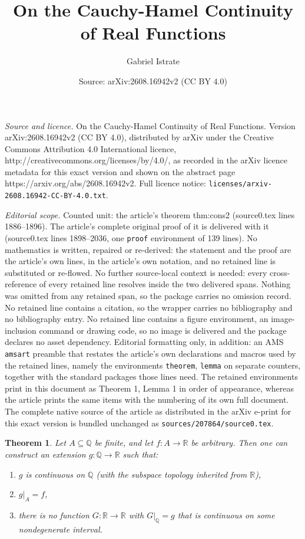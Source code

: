\documentclass[10pt,a4paper]{amsart}
\title{On the Cauchy-Hamel Continuity of Real Functions}
\author{Gabriel Istrate}
\date{Source: arXiv:2608.16942v2 (CC BY 4.0)}
\newtheorem{theorem}{Theorem}
\begin{document}
\maketitle

\noindent\emph{Source and licence.} On the Cauchy-Hamel Continuity of Real Functions. Version arXiv:2608.16942v2 (CC BY 4.0), distributed by arXiv under the Creative Commons Attribution 4.0 International licence, http://creativecommons.org/licenses/by/4.0/, as recorded in the arXiv licence metadata for this exact version and shown on the abstract page https://arxiv.org/abs/2608.16942v2. Full licence notice: \texttt{licenses/arxiv-2608.16942-CC-BY-4.0.txt}.\par\smallskip

\noindent\textit{Editorial scope.} Counted unit: the article's theorem thm:cons2 (source0.tex lines 1886--1896). The article's complete original proof of it is delivered with it (source0.tex lines 1898--2036, one \texttt{proof} environment of 139 lines). No mathematics is written, repaired or re-derived: the statement and the proof are the article's own lines, in the article's own notation, and no retained line is substituted or re-flowed.  No further source-local context is needed: every cross-reference of every retained line resolves inside the two delivered spans.  Nothing was omitted from any retained span, so the package carries no omission record.  No retained line contains a citation, so the wrapper carries no bibliography and no bibliography entry.  No retained line contains a figure environment, an image-inclusion command or drawing code, so no image is delivered and the package declares no asset dependency.  Editorial formatting only, in addition: an AMS \texttt{amsart} preamble that restates the article's own declarations and macros used by the retained lines, namely the environments \texttt{theorem}, \texttt{lemma} on separate counters, together with the standard packages those lines need.  The retained environments print in this document as Theorem 1, Lemma 1 in order of appearance, whereas the article prints the same items with the numbering of its own full document.  The complete native source of the article as distributed in the arXiv e-print for this exact version is bundled unchanged as \texttt{sources/207864/source0.tex}.
\begin{theorem}
Let $A\subseteq\mathbb{Q}$ be finite, and let $f:A\rightarrow\mathbb{R}$ be arbitrary. Then one can
construct an extension $g:\mathbb{Q}\rightarrow\mathbb{R}$ such that:
\begin{enumerate}
\item[(1)] $g$ is continuous on $\mathbb{Q}$ (with the subspace topology inherited from $\mathbb{R}$),
\item[(2)] $g|_A = f$,
\item[(3)] there is no function $G:\mathbb{R}\rightarrow\mathbb{R}$ with $G|_{\mathbb{Q}}=g$ that is continuous on some
nondegenerate interval.
\end{enumerate}
\label{thm:cons2} 
\end{theorem}
\end{document}
